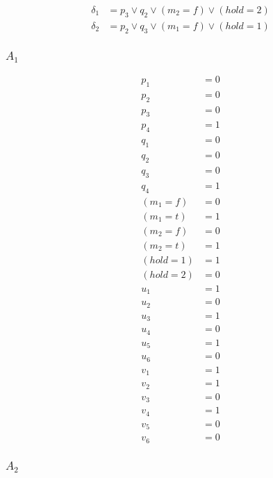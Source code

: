 \documentclass{scrartcl}
\begin{document}
\begin{align*}
  \delta_1 &= p_3 \lor q_2 \lor (m_2=f) \lor (hold=2) \\
  \delta_2 &= p_2 \lor q_3 \lor (m_1=f) \lor (hold=1)
\end{align*}

\subsubsection{$A_1$}

\begin{align*}
  p_1 &= 0 \\
  p_2 &= 0 \\
  p_3 &= 0 \\
  p_4 &= 1 \\
  q_1 &= 0 \\
  q_2 &= 0 \\
  q_3 &= 0 \\
  q_4 &= 1 \\
  (m_1=f) &= 0 \\
  (m_1=t) &= 1 \\
  (m_2=f) &= 0 \\
  (m_2=t) &= 1 \\
  (hold=1) &= 1 \\
  (hold=2) &= 0 \\
  u_1 &= 1 \\
  u_2 &= 0 \\
  u_3 &= 1 \\
  u_4 &= 0 \\
  u_5 &= 1 \\
  u_6 &= 0 \\
  v_1 &= 1 \\
  v_2 &= 1 \\
  v_3 &= 0 \\
  v_4 &= 1 \\
  v_5 &= 0 \\
  v_6 &= 0
\end{align*}

\subsubsection{$A_2$}
\end{document}
